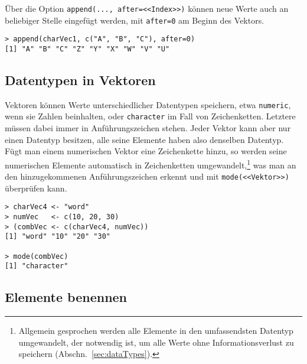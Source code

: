 Über die Option \lstinline!append(..., after=<<Index>>)! können neue Werte auch an beliebiger Stelle eingefügt werden, mit \lstinline!after=0! am Beginn des Vektors.
\begin{lstlisting}
> append(charVec1, c("A", "B", "C"), after=0)
[1] "A" "B" "C" "Z" "Y" "X" "W" "V" "U"
\end{lstlisting}

\subsection{Datentypen in Vektoren}

Vektoren können Werte unterschiedlicher Datentypen speichern, etwa \lstinline!numeric!, wenn sie Zahlen beinhalten, oder \lstinline!character! im Fall von Zeichenketten. Letztere müssen dabei immer in Anführungszeichen stehen. Jeder Vektor kann aber nur einen Datentyp besitzen, alle seine Elemente haben also denselben Datentyp. Fügt man einem numerischen Vektor eine Zeichenkette hinzu, so werden seine numerischen Elemente automatisch in Zeichenketten umgewandelt,\footnote{Allgemein gesprochen werden alle Elemente in den umfassendsten Datentyp umgewandelt, der notwendig ist, um alle Werte ohne Informationsverlust zu speichern (Abschn.\ \ref{sec:dataTypes}).} was man an den hinzugekommenen Anführungszeichen erkennt und mit \lstinline!mode(<<Vektor>>)! überprüfen kann.
\begin{lstlisting}
> charVec4 <- "word"
> numVec   <- c(10, 20, 30)
> (combVec <- c(charVec4, numVec))
[1] "word" "10" "20" "30"

> mode(combVec)
[1] "character"
\end{lstlisting}

\subsection{Elemente benennen}
\label{sec:valNames}

